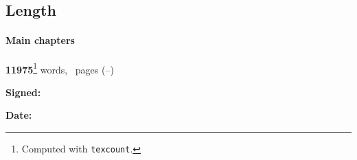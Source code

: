 \ifanonymised
\subsection*{Length}

\paragraph{Main chapters} 
\textbf{11975}\footnote{Computed with \texttt{texcount}.}
words, \textbf{\contentpages}~pages
(\pageref{firstcontentpage}--\pageref{lastcontentpage})

\fi

\vfill

\textbf{Signed:} 
\ifanonymised
\candidate
\else
\authorself{}
\fi

\vspace{0.5cm}
\textbf{Date:} \submissiondate{}
\vspace{3cm}

\endgroup
